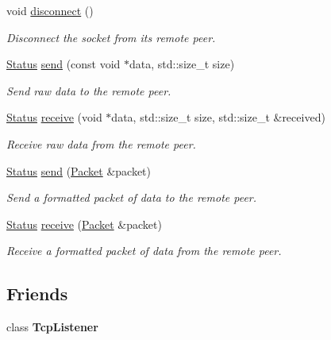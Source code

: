 \begin{DoxyCompactItemize}
void \hyperlink{classsf_1_1TcpSocket_ac18f518a9be3d6be5e74b9404c253c1e}{disconnect} ()
\begin{DoxyCompactList}\small\item\em Disconnect the socket from its remote peer. \end{DoxyCompactList}\item 
\hyperlink{classsf_1_1Socket_a51bf0fd51057b98a10fbb866246176dc}{Status} \hyperlink{classsf_1_1TcpSocket_affce26ab3bcc4f5b9269dad79db544c0}{send} (const void $\ast$data, std\-::size\-\_\-t size)
\begin{DoxyCompactList}\small\item\em Send raw data to the remote peer. \end{DoxyCompactList}\item 
\hyperlink{classsf_1_1Socket_a51bf0fd51057b98a10fbb866246176dc}{Status} \hyperlink{classsf_1_1TcpSocket_a90ce50811ea61d4f00efc62bb99ae1af}{receive} (void $\ast$data, std\-::size\-\_\-t size, std\-::size\-\_\-t \&received)
\begin{DoxyCompactList}\small\item\em Receive raw data from the remote peer. \end{DoxyCompactList}\item 
\hyperlink{classsf_1_1Socket_a51bf0fd51057b98a10fbb866246176dc}{Status} \hyperlink{classsf_1_1TcpSocket_a0f8276e2b1c75aac4a7b0a707b250f44}{send} (\hyperlink{classsf_1_1Packet}{Packet} \&packet)
\begin{DoxyCompactList}\small\item\em Send a formatted packet of data to the remote peer. \end{DoxyCompactList}\item 
\hyperlink{classsf_1_1Socket_a51bf0fd51057b98a10fbb866246176dc}{Status} \hyperlink{classsf_1_1TcpSocket_aa655352609bc9804f2baa020df3e7331}{receive} (\hyperlink{classsf_1_1Packet}{Packet} \&packet)
\begin{DoxyCompactList}\small\item\em Receive a formatted packet of data from the remote peer. \end{DoxyCompactList}\end{DoxyCompactItemize}
\subsection*{Friends}
\begin{DoxyCompactItemize}
\item 
\hypertarget{classsf_1_1TcpSocket_a2b2dd140834917bd44b512236bddea7c}{class {\bfseries Tcp\-Listener}}\label{classsf_1_1TcpSocket_a2b2dd140834917bd44b512236bddea7c}

\end{DoxyCompactItemize}

